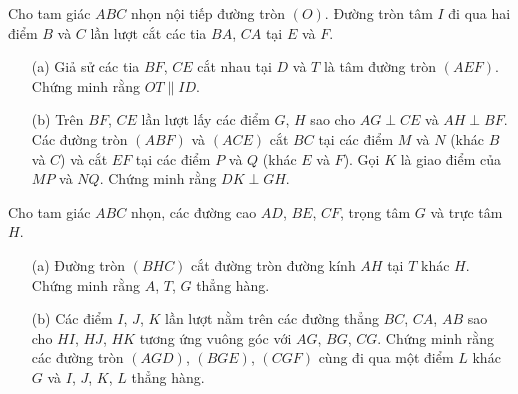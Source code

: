         \boom

        \begin{exercise}
            Cho tam giác \(ABC\) nhọn nội tiếp đường tròn \((O)\). Đường tròn tâm \(I\) đi qua hai điểm \(B\) và \(C\) lần lượt cắt các tia \(BA\), \(CA\) tại \(E\) và \(F\).
            \begin{enumerate}
                \item[(a)] Giả sử các tia \(BF\), \(CE\) cắt nhau tại \(D\) và \(T\) là tâm đường tròn \((AEF)\). Chứng minh rằng \(OT \parallel ID\).
                \item[(b)] Trên \(BF\), \(CE\) lần lượt lấy các điểm \(G\), \(H\) sao cho \(AG \perp CE\) và \(AH \perp BF\). Các đường tròn \((ABF)\) và \((ACE)\) cắt \(BC\) tại các điểm \(M\) và \(N\) (khác \(B\) và \(C\)) và cắt \(EF\) tại các điểm \(P\) và \(Q\) (khác \(E\) và \(F\)). Gọi \(K\) là giao điểm của \(MP\) và \(NQ\). Chứng minh rằng \(DK \perp GH\).
            \end{enumerate}
        \end{exercise}

        \boom

        \begin{exercise}
            Cho tam giác \(ABC\) nhọn, các đường cao \(AD\), \(BE\), \(CF\), trọng tâm \(G\) và trực tâm \(H\).
            \begin{enumerate}
                \item[(a)] Đường tròn \((BHC)\) cắt đường tròn đường kính \(AH\) tại \(T\) khác \(H\). Chứng minh rằng \(A\), \(T\), \(G\) thẳng hàng.
                \item[(b)] Các điểm \(I\), \(J\), \(K\) lần lượt nằm trên các đường thẳng \(BC\), \(CA\), \(AB\) sao cho \(HI\), \(HJ\), \(HK\) tương ứng vuông góc với \(AG\), \(BG\), \(CG\). Chứng minh rằng các đường tròn \((AGD)\), \((BGE)\), \((CGF)\) cùng đi qua một điểm \(L\) khác \(G\) và \(I\), \(J\), \(K\), \(L\) thẳng hàng.
            \end{enumerate}
        \end{exercise}
        
        \boom

